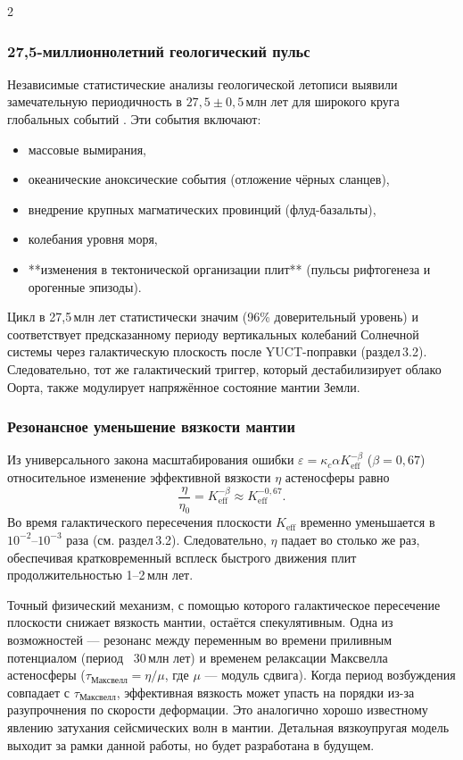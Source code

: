 \documentclass[11pt,a4paper]{article}
\begin{document}
\begin{multicols}{2}
		\subsubsection{27,5-миллионнолетний геологический пульс}
		
		Независимые статистические анализы геологической летописи выявили замечательную периодичность
		в \(27,5 \pm 0,5\) млн лет для широкого круга глобальных событий \cite{Rampino2021,Rampino2023}.
		Эти события включают:
		\begin{itemize}
			\item массовые вымирания,
			\item океанические аноксические события (отложение чёрных сланцев),
			\item внедрение крупных магматических провинций (флуд-базальты),
			\item колебания уровня моря,
			\item **изменения в тектонической организации плит** (пульсы рифтогенеза и орогенные эпизоды).
		\end{itemize}
		Цикл в 27,5 млн лет статистически значим (96\% доверительный уровень) и соответствует предсказанному
		периоду вертикальных колебаний Солнечной системы через галактическую плоскость после YUCT-поправки
		(раздел 3.2). Следовательно, тот же галактический триггер, который дестабилизирует облако Оорта, также модулирует напряжённое состояние мантии Земли.
		
		\subsubsection{Резонансное уменьшение вязкости мантии}
		
		Из универсального закона масштабирования ошибки \(\varepsilon = \kappa_c \alpha K_{\mathrm{eff}}^{-\beta}\)
		(\(\beta=0,67\)) относительное изменение эффективной вязкости \(\eta\) астеносферы равно
		\[
		\frac{\eta}{\eta_0} = K_{\mathrm{eff}}^{-\beta} \approx K_{\mathrm{eff}}^{-0,67}.
		\]
		Во время галактического пересечения плоскости \(K_{\mathrm{eff}}\) временно уменьшается в
		\(10^{-2}\)–\(10^{-3}\) раза (см. раздел 3.2). Следовательно, \(\eta\) падает во столько же раз,
		обеспечивая кратковременный всплеск быстрого движения плит продолжительностью 1–2 млн лет.
		
		Точный физический механизм, с помощью которого галактическое пересечение плоскости снижает вязкость мантии, остаётся спекулятивным. Одна из возможностей — резонанс между переменным во времени приливным потенциалом (период ~30 млн лет) и временем релаксации Максвелла астеносферы (\(\tau_{\mathrm{Максвелл}} = \eta/\mu\), где \(\mu\) — модуль сдвига). Когда период возбуждения совпадает с \(\tau_{\mathrm{Максвелл}}\), эффективная вязкость может упасть на порядки из-за разупрочнения по скорости деформации. Это аналогично хорошо известному явлению затухания сейсмических волн в мантии. Детальная вязкоупругая модель выходит за рамки данной работы, но будет разработана в будущем.
		

\end{multicols}
\end{document}
